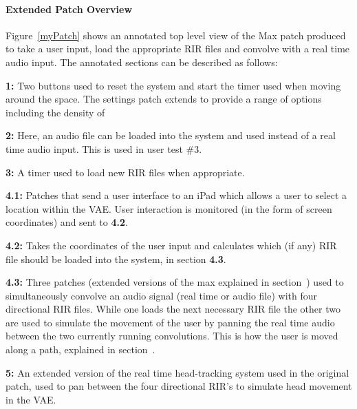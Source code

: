 \documentclass[../../main.tex]{subfiles}
\begin{document}
			\paragraph{Extended Patch Overview}
				Figure~\ref{myPatch} shows an annotated top level view of the Max patch produced to take a user input, load the appropriate \ac{RIR} files and convolve with a real time audio input. The annotated sections can be described as follows:

				\textbf{1:} Two buttons used to reset the system and start the timer used when moving around the space. The settings patch extends to provide a range of options including the density of 

				\textbf{2:} Here, an audio file can be loaded into the system and used instead of a real time audio input. This is used in user test \#3.

				\textbf{3:} A timer used to load new \ac{RIR} files when appropriate.

				\textbf{4.1:} Patches that send a user interface to an iPad which allows a user to select a location within the \ac{VAE}. User interaction is monitored (in the form of screen coordinates) and sent to \textbf{4.2}.

				\textbf{4.2:} Takes the coordinates of the user input and calculates which (if any) \ac{RIR} file should be loaded into the system, in section \textbf{4.3}.

				\textbf{4.3:} Three patches (extended versions of the max explained in section~) used to simultaneously convolve an audio signal (real time or audio file) with four directional \ac{RIR} files. While one loads the next necessary \ac{RIR} file the other two are used to simulate the movement of the user by panning the real time audio between the two currently running convolutions. This is how the user is moved along a path, explained in section~.

				\textbf{5:} An extended version of the real time head-tracking system used in the original patch, used to pan between the four directional \ac{RIR}'s to simulate head movement in the \ac{VAE}.
\end{document}
